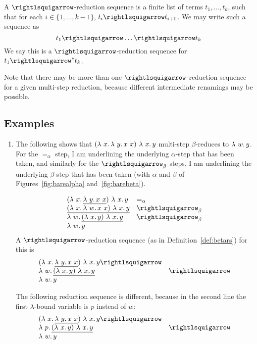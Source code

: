 \begin{definition}
\label{def:betars}
  A $\betaa$-reduction sequence is a finite list of terms
  $t_1,\ldots,t_k$, such that for each $i\in\{1,\ldots,k-1\}$,
  $t_i \betaa t_{i+1}$.  We may write such
  a sequence as
  \[
  t_1 \betaa \ldots \betaa t_k
  \]
  We say this is a $\betaa$-reduction sequence for $t_1\betaa^* t_k$.
\end{definition}

Note that there may be more than one $\betaa$-reduction sequence
for a given multi-step reduction, because different intermediate
renamings may be possible.

\subsection{Examples}

\begin{enumerate}
\item The following shows that $(\lambda\ x.\, \lambda\ y.\, x\ x)\ \lambda\ x.\, y$
  multi-step $\beta$-reduces to $\lambda\ w.\, y$.  For the $=_\alpha$
  step, I am underlining the underlying $\alpha$-step that has been
  taken, and similarly for the $\curva_\beta$ steps, I am
  underlining the underlying $\beta$-step that has been taken (with
  $\alpha$ and $\beta$ of Figures~\ref{fig:barealpha} and~\ref{fig:barebeta}).

  \[
\begin{array}{ll}
  (\lam{x}{\underline{\lam{y}{x\ x}}})\ \lam{x}{y} & =_\alpha \\
  \underline{(\lam{x}{\lam{w}{x\ x}})\ \lam{x}{y}} & \curva_\beta \\
  \lam{w}{\underline{(\lam{x}{y})\ \lam{x}{y}}} & \curva_\beta \\
  \lam{w}{y} & \ 
\end{array}
\]
  A $\betaa$-reduction sequence (as in Definition~\ref{def:betars}) for this is
\[
\begin{array}{ll}
  (\lam{x}{\underline{\lam{y}{x\ x}}})\ \lam{x}{y} \betaa \\
  \lam{w}{\underline{(\lam{x}{y})\ \lam{x}{y}}} & \betaa \\
  \lam{w}{y} & \
\end{array}
\]

The following reduction sequence is different, because in the second line the first
$\lambda$-bound variable is $p$ instead of $w$:
\[
\begin{array}{ll}
  (\lam{x}{\underline{\lam{y}{x\ x}}})\ \lam{x}{y} \betaa \\
  \lam{p}{\underline{(\lam{x}{y})\ \lam{x}{y}}} & \betaa \\
  \lam{w}{y} & \
\end{array}
\]

\end{enumerate}

